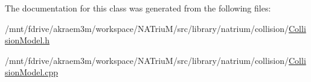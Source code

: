 The documentation for this class was generated from the following files:\begin{DoxyCompactItemize}
\item 
/mnt/fdrive/akraem3m/workspace/NATriuM/src/library/natrium/collision/\hyperlink{CollisionModel_8h}{CollisionModel.h}\item 
/mnt/fdrive/akraem3m/workspace/NATriuM/src/library/natrium/collision/\hyperlink{CollisionModel_8cpp}{CollisionModel.cpp}\end{DoxyCompactItemize}
